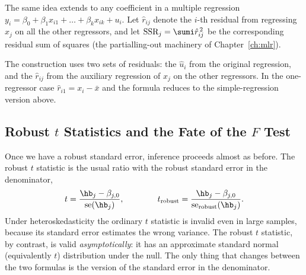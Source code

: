 The same idea extends to any coefficient in a multiple regression $y_i = \beta_0 + \beta_1 x_{i1} + \dots + \beta_k x_{ik} + u_i$. Let $\hat r_{ij}$ denote the $i$-th residual from regressing $x_j$ on all the other regressors, and let $\text{SSR}_j = \sumi \hat r_{ij}^{\,2}$ be the corresponding residual sum of squares (the partialling-out machinery of Chapter~\ref{ch:mlr}).


The construction uses two sets of residuals: the $\hat u_i$ from the original regression, and the $\hat r_{ij}$ from the auxiliary regression of $x_j$ on the other regressors. In the one-regressor case $\hat r_{i1} = x_i - \bar x$ and the formula reduces to the simple-regression version above.

\subsection{Robust $t$ Statistics and the Fate of the $F$ Test}

Once we have a robust standard error, inference proceeds almost as before. The robust $t$ statistic is the usual ratio with the robust standard error in the denominator,
\[
t = \frac{\hb_j - \beta_{j,0}}{\mathrm{se}(\hb_j)},
\qquad\qquad
t_{\text{robust}} = \frac{\hb_j - \beta_{j,0}}{\mathrm{se}_{\text{robust}}(\hb_j)} .
\]
Under heteroskedasticity the ordinary $t$ statistic is invalid even in large samples, because its standard error estimates the wrong variance. The robust $t$ statistic, by contrast, is valid \emph{asymptotically}: it has an approximate standard normal (equivalently $t$) distribution under the null. The only thing that changes between the two formulas is the version of the standard error in the denominator.


